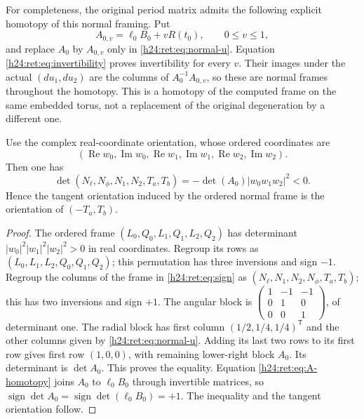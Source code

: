 For completeness, the original period matrix admits the following
explicit homotopy of this normal framing.  Put
\begin{equation}
 A_{0,v}=\ell_0B_0+vR(t_0),\qquad 0\leq v\leq1,
 \label{h24:ret:eq:A-homotopy}
\end{equation}
and replace \(A_0\) by \(A_{0,v}\) only in
\eqref{h24:ret:eq:normal-u}.  Equation \eqref{h24:ret:eq:invertibility} proves
invertibility for every \(v\).  Their images under the actual
\((du_1,du_2)\) are the columns of \(A_0^{-1}A_{0,v}\), so these
are normal frames throughout the homotopy.  This is a homotopy of
the computed frame on the same embedded torus, not a replacement of
the original degeneration by a different one.

\begin{lemma}
Use the complex real-coordinate orientation, whose ordered coordinates are
\[
 (\operatorname{Re}w_0,\operatorname{Im}w_0,
  \operatorname{Re}w_1,\operatorname{Im}w_1,
  \operatorname{Re}w_2,\operatorname{Im}w_2).
\]
Then one has
\begin{equation}
 \det(N_\ell,N_\phi,N_1,N_2,T_a,T_b)
       =-\det(A_0)|w_0w_1w_2|^2<0.
 \label{h24:ret:eq:sign}
\end{equation}
Hence the tangent orientation induced by the ordered normal frame is
the orientation of \((-T_a,T_b)\).
\end{lemma}
\begin{proof}
The ordered frame \((L_0,Q_0,L_1,Q_1,L_2,Q_2)\) has determinant
\(|w_0|^2|w_1|^2|w_2|^2>0\) in real coordinates.  Regroup its rows
as \((L_0,L_1,L_2,Q_0,Q_1,Q_2)\); this permutation has three
inversions and sign \(-1\).  Regroup the columns of the frame in
\eqref{h24:ret:eq:sign} as
\((N_\ell,N_1,N_2,N_\phi,T_a,T_b)\); this has two inversions and
sign \(+1\).  The angular block is
\(\left(\begin{smallmatrix}1&-1&-1\\0&1&0\\0&0&1\end{smallmatrix}\right)\),
of determinant one.  The radial block has first column
\((1/2,1/4,1/4)^{\mathsf T}\) and the other columns given by
\eqref{h24:ret:eq:normal-u}.  Adding its last two rows to its first row gives
first row \((1,0,0)\), with remaining lower-right block \(A_0\).
Its determinant is \(\det A_0\).  This proves the equality.
Equation \eqref{h24:ret:eq:A-homotopy} joins \(A_0\) to \(\ell_0B_0\)
through invertible matrices, so
\(\operatorname{sign}\det A_0=\operatorname{sign}\det(\ell_0B_0)=+1\).
The inequality and the tangent orientation follow.
\end{proof}

